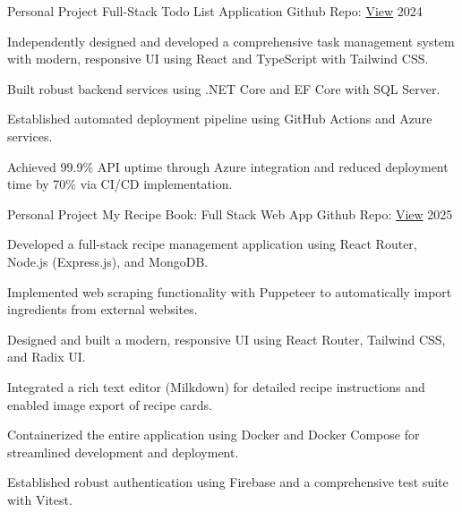 \documentclass[11pt, a4paper]{awesome-cv}
\begin{document}
\begin{cventries}
  \cventry
    {Personal Project} %
    {Full-Stack Todo List Application} %
    {Github Repo: \href{https://github.com/realYushi/todo-list}{View} } %
    {2024} %
    {
      \begin{cvitems}
        \item {Independently designed and developed a comprehensive task management system with modern, responsive UI using React and TypeScript with Tailwind CSS.}
        \item {Built robust backend services using .NET Core and EF Core with SQL Server.}
        \item {Established automated deployment pipeline using GitHub Actions and Azure services.}
        \item {Achieved 99.9\% API uptime through Azure integration and reduced deployment time by 70\% via CI/CD implementation.}
      \end{cvitems}
    }
  \cventry
    {Personal Project} %
    {My Recipe Book: Full Stack Web App} %
    {Github Repo: \href{https://github.com/realYushi/my-recipe-book}{View} } %
    {2025} %
    {
      \begin{cvitems}
        \item {Developed a full-stack recipe management application using React Router, Node.js (Express.js), and MongoDB.}
        \item {Implemented web scraping functionality with Puppeteer to automatically import ingredients from external websites.}
        \item {Designed and built a modern, responsive UI using React Router, Tailwind CSS, and Radix UI.}
        \item {Integrated a rich text editor (Milkdown) for detailed recipe instructions and enabled image export of recipe cards.}
        \item {Containerized the entire application using Docker and Docker Compose for streamlined development and deployment.}
        \item {Established robust authentication using Firebase and a comprehensive test suite with Vitest.}
      \end{cvitems}
    }
\end{cventries}
\end{document}
